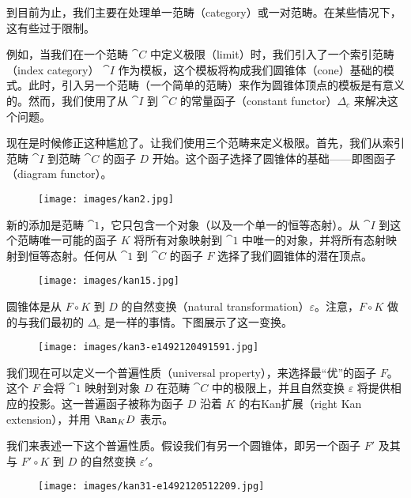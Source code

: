 
\lettrine[lhang=0.17]{到}{目前为止，我们主要在处理}单一范畴（category）或一对范畴。在某些情况下，这有些过于限制。

例如，当我们在一个范畴 $\cat{C}$ 中定义极限（limit）时，我们引入了一个索引范畴（index category） $\cat{I}$ 作为模板，这个模板将构成我们圆锥体（cone）基础的模式。此时，引入另一个范畴（一个简单的范畴）来作为圆锥体顶点的模板是有意义的。然而，我们使用了从 $\cat{I}$ 到 $\cat{C}$ 的常量函子（constant functor）$\Delta_c$ 来解决这个问题。

现在是时候修正这种尴尬了。让我们使用三个范畴来定义极限。首先，我们从索引范畴 $\cat{I}$ 到范畴 $\cat{C}$ 的函子 $D$ 开始。这个函子选择了圆锥体的基础——即图函子（diagram functor）。

\begin{figure}[H]
  \centering
  \texttt{[image: images/kan2.jpg]}
\end{figure}

\noindent
新的添加是范畴 $\cat{1}$，它只包含一个对象（以及一个单一的恒等态射）。从 $\cat{I}$ 到这个范畴唯一可能的函子 $K$ 将所有对象映射到 $\cat{1}$ 中唯一的对象，并将所有态射映射到恒等态射。任何从 $\cat{1}$ 到 $\cat{C}$ 的函子 $F$ 选择了我们圆锥体的潜在顶点。

\begin{figure}[H]
  \centering
  \texttt{[image: images/kan15.jpg]}
\end{figure}

\noindent
圆锥体是从 $F \circ K$ 到 $D$ 的自然变换（natural transformation）$\varepsilon$。注意，$F \circ K$ 做的与我们最初的 $\Delta_c$ 是一样的事情。下图展示了这一变换。

\begin{figure}[H]
  \centering
  \texttt{[image: images/kan3-e1492120491591.jpg]}
\end{figure}

\noindent
我们现在可以定义一个普遍性质（universal property），来选择最“优”的函子 $F$。这个 $F$ 会将 $\cat{1}$ 映射到对象 $D$ 在范畴 $\cat{C}$ 中的极限上，并且自然变换 $\varepsilon$ 将提供相应的投影。这一普遍函子被称为函子 $D$ 沿着 $K$ 的右Kan扩展（right Kan extension），并用 $\Ran_{K}D$ 表示。

我们来表述一下这个普遍性质。假设我们有另一个圆锥体，即另一个函子 $F'$ 及其与 $F' \circ K$ 到 $D$ 的自然变换 $\varepsilon'$。

\begin{figure}[H]
  \centering
  \texttt{[image: images/kan31-e1492120512209.jpg]}
\end{figure}

